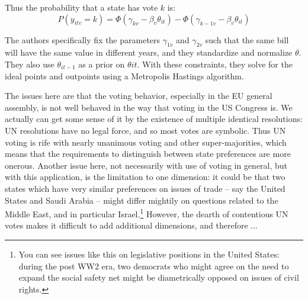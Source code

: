 Thus the probability that a state has vote $k$ is:
\begin{equation}
P(y_{itv} = k) = \Phi(\gamma_{kv} - \beta_{v}\theta_{it}) - \Phi(\gamma_{k-1v} - \beta_{v}\theta_{it})
\end{equation}

The authors specifically fix the parameters $\gamma_{1v}$ and $\gamma_{2v}$ such that the same bill will have the same value in different years, and they standardize and normalize $\theta$. They also use $\theta_{it-1}$ as a prior on $\theta{it}$. With these constraints, they solve for the ideal points and outpoints using a Metropolis Hastings algorithm.

The issues here are that the voting behavior, especially in the EU general assembly, is not well behaved in the way that voting in the US Congress is. We actually can get some sense of it by the existence of multiple identical resolutions: UN resolutions have no legal force, and so most votes are symbolic. Thus UN voting is rife with nearly unanimous voting and other super-majorities, which means that the requirements to distinguish between state preferences are more onerous. Another issue here, not necessarily with use of voting in general, but with this application, is the limitation to one dimension: it could be that two states which have very similar preferences on issues of trade -- say the United States and  Saudi Arabia -- might differ mightily on questions related to the Middle East, and in particular Israel.\footnote{You can see issues like this on legislative positions in the United States: during the post WW2 era, two democrats who might agree on the need to expand the social safety net might be diametrically opposed on issues of civil rights.} However, the dearth of contentious UN votes makes it difficult to add additional dimensions, and therefore ...